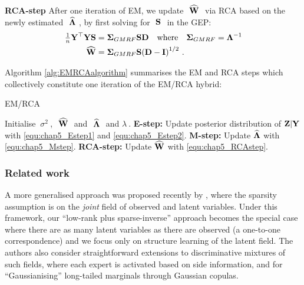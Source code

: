       \textbf{RCA-step} After one iteration of EM, we update $~\widehat{\mathbf{W}}~$ via RCA based on the newly estimated $~\widehat{\mathbf{\Lambda}}~$, by first solving for $~\mathbf{S}~$ in the GEP:
      \begin{align} \label{equ:chap5_RCAstep}
        \begin{split}
	\tfrac{1}{n} \mathbf{Y}^\top \mathbf{Y} \mathbf{S} &= \mathbf{\Sigma}_{GMRF} \mathbf{S} \mathbf{D} \quad \textrm{where} \quad \mathbf{\Sigma}_{GMRF} = \mathbf{\Lambda}^{-1} \\
	\widehat{\mathbf{W}} &= \mathbf{\Sigma}_{GMRF} \mathbf{S} \mathbf{(D - I)}^{1/2} ~.
        \end{split}
      \end{align}
 
      Algorithm \ref{alg:EMRCAalgorithm} summarises the EM and RCA steps which collectively constitute one iteration of the EM/RCA hybrid:
      \begin{algorithm}
        \caption{EM/RCA} \label{alg:EMRCAalgorithm}
        \begin{algorithmic}
	\STATE Initialise $~\sigma^2~$, $~\widehat{\mathbf{W}}~$ and $~\widehat{\mathbf{\Lambda}}~$ and $\lambda~$.
 	\REPEAT
 	  \STATE \textbf{E-step:} Update posterior distribution of $\mathbf{Z}|\mathbf{Y}$ with \eqref{equ:chap5_Estep1} and \eqref{equ:chap5_Estep2}.
 	  \STATE \textbf{M-step:} Update $\widehat{\mathbf{\Lambda}}$ with \eqref{equ:chap5_Mstep}.
 	  \STATE \textbf{RCA-step:} Update $\widehat{\mathbf{W}}$ with \eqref{equ:chap5_RCAstep}.
         \end{algorithmic}
       \end{algorithm}
       
       
    \subsubsection{Related work}
    A more generalised approach was proposed recently by \citet{Agakov:Mixtures12},
    where the sparsity assumption is on the \emph{joint} field of observed and latent variables.
    Under this framework, our ``low-rank plus sparse-inverse'' approach becomes the special case where there are as many latent variables as
    there are observed (a one-to-one correspondence) and we focus only on structure learning of the latent field.
    The authors also consider straightforward extensions to discriminative mixtures of such fields,
    where each expert is activated based on side information, and for ``Gaussianising'' long-tailed marginals
    through Gaussian copulas.
    
